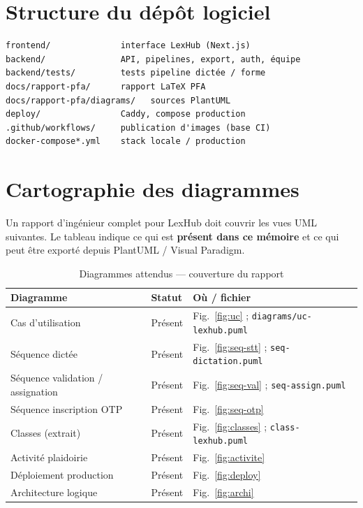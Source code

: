 \appendix

\chapter{Structure du dépôt logiciel}

\begin{verbatim}
frontend/              interface LexHub (Next.js)
backend/               API, pipelines, export, auth, équipe
backend/tests/         tests pipeline dictée / forme
docs/rapport-pfa/      rapport LaTeX PFA
docs/rapport-pfa/diagrams/   sources PlantUML
deploy/                Caddy, compose production
.github/workflows/     publication d'images (base CI)
docker-compose*.yml    stack locale / production
\end{verbatim}

\chapter{Cartographie des diagrammes}
\label{ch:diagrammes}

Un rapport d'ingénieur complet pour LexHub doit couvrir les vues UML suivantes. Le tableau indique ce qui est \textbf{présent dans ce mémoire} et ce qui peut être exporté depuis PlantUML / Visual Paradigm.

\begin{table}[H]
\centering
\caption{Diagrammes attendus --- couverture du rapport}
\label{tab:diagrammes}
\footnotesize
\renewcommand{\arraystretch}{1.25}
\begin{tabular}{@{}p{4.4cm}p{2.4cm}p{5.8cm}@{}}
\toprule
\textbf{Diagramme} & \textbf{Statut} & \textbf{Où / fichier} \\
\midrule
Cas d'utilisation & Présent & Fig.~\ref{fig:uc} ; \texttt{diagrams/uc-lexhub.puml} \\
Séquence dictée & Présent & Fig.~\ref{fig:seq-stt} ; \texttt{seq-dictation.puml} \\
Séquence validation / assignation & Présent & Fig.~\ref{fig:seq-val} ; \texttt{seq-assign.puml} \\
Séquence inscription OTP & Présent & Fig.~\ref{fig:seq-otp} \\
Classes (extrait) & Présent & Fig.~\ref{fig:classes} ; \texttt{class-lexhub.puml} \\
Activité plaidoirie & Présent & Fig.~\ref{fig:activite} \\
Déploiement production & Présent & Fig.~\ref{fig:deploy} \\
Architecture logique & Présent & Fig.~\ref{fig:archi} \\
\bottomrule
\end{tabular}
\end{table}

